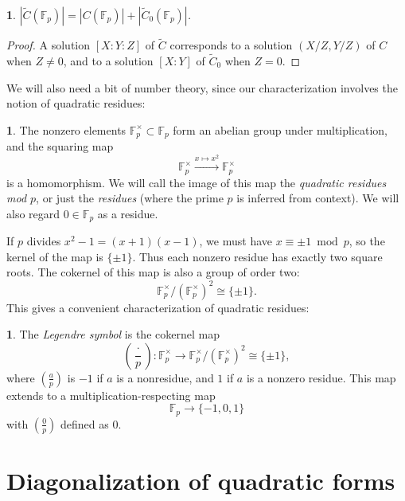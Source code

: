 \documentclass[10pt,a4paper]{amsart}
\numberwithin{equation}{section}
\numberwithin{figure}{section}
\numberwithin{table}{section}
\theoremstyle{definition}
\theoremstyle{plain}
\theoremstyle{remark}
\theoremstyle{plain}
\theoremstyle{definition}
\newtheorem{defn}[thm]{\protect\definitionname}
\theoremstyle{plain}
\theoremstyle{plain}
\newtheorem{lem}[thm]{\protect\lemmaname}
\providecommand{\definitionname}{Definition}
\providecommand{\lemmaname}{Lemma}
\newcommand{\legendre}[2]{\genfrac{(}{)}{}{}{#1}{#2}}
\newcommand{\F}{\mathbb{F}}
\begin{document}
	\begin{lem}\label{lem:relate-solutions-affine-proj}
		$|\widetilde{C}(\F_p)| = |C(\F_p)| + |\widetilde{C}_0(\F_p)|$.
	\end{lem} 
	\begin{proof}
		A solution $[X:Y:Z]$ of $\widetilde{C}$ corresponds 
		to a solution $(X/Z,Y/Z)$ of $C$ when $Z \neq 0$,
		and to a solution $[X:Y]$ of $\widetilde{C}_0$ 
		when $Z = 0$.  
	\end{proof}
	
	We will also need a bit of number theory, since our characterization
	involves the notion of quadratic residues:
	\begin{defn}
		The nonzero elements $\F_p^\times \subset \F_p$ form an abelian
		group under multiplication, and the squaring map 
		\[ \F^\times_p \xrightarrow{x \mapsto x^2} \F^\times_p \]
		is a homomorphism. We will call the image of this map the
		\emph{quadratic residues mod $p$}, or just the \emph{residues} (where the
		prime $p$ is inferred from context). We will also regard $0\in\F_p$ as a residue.
	\end{defn}
	
	If $p$ divides $x^2 - 1 = (x+1)(x-1)$, we must have $x \equiv \pm 1 \bmod{p}$, so 
	the kernel of the map is $\{\pm 1\}$. Thus each nonzero residue has exactly two 
	square roots. The cokernel of this map is also a group of order two: 
	\begin{equation}\label{eqn:cokersquare}
\F_p^\times / (\F_p^\times)^2 \cong \{\pm 1\}.
\end{equation}
	This gives a convenient characterization of quadratic residues:
	\begin{defn}
		The \emph{Legendre symbol} is the cokernel map    
		\[ \legendre{\cdot}{p}: 
		\F_p^\times \to \F_p^\times / (\F_p^\times)^2 \cong \{\pm 1\}, \]
		where $\legendre{a}{p}$ is $-1$ if $a$ is a nonresidue,
		and $1$ if $a$ is a nonzero residue. This map extends to a multiplication-respecting map
		\[ \F_p \to \{-1,0,1\} \]
		with $\legendre{0}{p}$ defined as $0$.
	\end{defn}
	
	\section{Diagonalization of quadratic forms}
	\label{sec:diagonalizing-quadratic-forms} 
	
\end{document}
